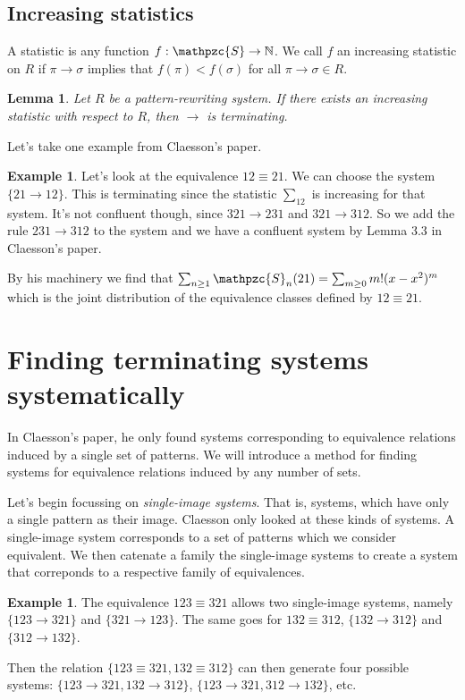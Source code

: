 \documentclass[a4paper, 11pt]{article}
\newtheorem{lemma}[theorem]{Lemma}
\theoremstyle{definition}
\newtheorem{example}[theorem]{Example}
\newcommand{\Sym}{\mathpzc{S}}
\begin{document}
\subsection{Increasing statistics}
A statistic is any function $f : \Sym \to \mathbb{N}$. We call $f$ an increasing
statistic on $R$ if $\pi \to \sigma$ implies that $f(\pi) < f(\sigma)$ for all
$\pi \to \sigma \in R$.

\begin{lemma}
    Let $R$ be a pattern-rewriting system. If there exists an increasing
    statistic with respect to $R$, then $\to$ is terminating.    
\end{lemma}

Let's take one example from Claesson's paper.
\begin{example}
    Let's look at the equivalence $12 \equiv 21$. We can choose the system 
    $\{ 21 \to 12 \}$. This is terminating since the statistic $\sum_{12}$ is
    increasing for that system. It's not confluent though, since $321 \to 231$
    and $321 \to 312$. So we add the rule $231 \to 312$ to the system and we
    have a confluent system by Lemma 3.3 in Claesson's paper. 

    By his machinery we find that $\sum_{n \geq 1} \Sym_n(21) = \sum_{m \geq 0}
    m!(x-x^2)^m$ which is the joint distribution of the equivalence classes
    defined by $12 \equiv 21$.
\end{example}

\section{Finding terminating systems systematically}
In Claesson's paper, he only found systems corresponding to equivalence
relations induced by a single set of patterns. We will introduce a method for
finding systems for equivalence relations induced by any number of sets.

Let's begin focussing on \emph{single-image systems}. That is, systems, which
have only a single pattern as their image. Claesson only looked at these kinds
of systems. A single-image system corresponds to a set of patterns which we
consider equivalent. We then catenate a family the single-image systems to
create a system that correponds to a respective family of equivalences.

\begin{example}
    The equivalence $123 \equiv 321$ allows two single-image systems, namely $\{123 \to
    321\}$ and $\{321 \to 123\}$. The same goes for $132 \equiv 312$, $\{132 \to
    312\}$ and $\{312 \to 132\}$.

    Then the relation $\{123 \equiv 321, 132 \equiv 312\}$ can then generate
    four possible systems: $\{123 \to 321, 132 \to 312\}$, $\{123 \to 321, 312
    \to 132\}$, etc.
\end{example}
\end{document}
